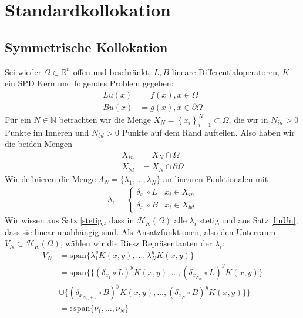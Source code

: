 \chapter{Standardkollokation}
\label{cha:Standardkollokation}

\section{Symmetrische Kollokation}
\label{sec:SymKol}
Sei wieder $\Omega \subset \mathbb{R}^n$ offen und beschränkt, $L,B$ lineare Differentialoperatoren, $K$ ein \gls{SPD} Kern und folgendes Problem gegeben:
\begin{align*}
L u(x) &= f(x), x \in \Omega \\
B u(x) &= g(x), x \in \partial \Omega
\end{align*}
Für ein $N \in \mathbb{N}$ betrachten wir die Menge $X_N = \left\{ x_i \right\}_{i=1}^N \subset \Omega$, die wir in $N_{in} > 0$ Punkte im Inneren und $N_{bd} > 0$ Punkte auf dem Rand aufteilen. Also haben wir die beiden Mengen
\begin{align*}
X_{in} &= X_N \cap \Omega\\
X_{bd} &= X_N \cap \partial \Omega
\end{align*}
Wir definieren die Menge $\Lambda_N = \{\lambda_1, \dots, \lambda_N\}$ an linearen Funktionalen mit
\begin{align*}
\lambda_i =
\begin{cases}
\delta_{x_i} \circ L & x_i \in X_{in}\\
\delta_{x_i} \circ B & x_i \in X_{bd}
\end{cases}
\end{align*}
Wir wissen aus Satz \ref{stetig}, dass in $\mathcal{H}_K(\Omega)$ alle $\lambda_i$ stetig und aus Satz \ref{linUn}, dass sie linear unabhängig sind. Als Ansatzfunktionen, also den Unterraum $V_N \subset \mathcal{H}_K(\Omega)$, wählen wir die Riesz Repräsentanten der $\lambda_i$:
\begin{align*}
V_N &= \text{span} \{\lambda_1^y K(x,y), \dots , \lambda_N^y K(x,y)\}\\
&= \text{span} \{\{(\delta_{x_1} \circ L)^y K(x,y), \dots, (\delta_{x_{N_{in}}} \circ L)^y K(x,y)\}\\
&\cup \{ (\delta_{x_{N_{in} + 1}} \circ B)^y K(x,y), \dots, (\delta_{x_{N}} \circ B)^y K(x,y)\}\}\\
&=: \text{span} \{\nu_1, \dots, \nu_N\}
\end{align*}

